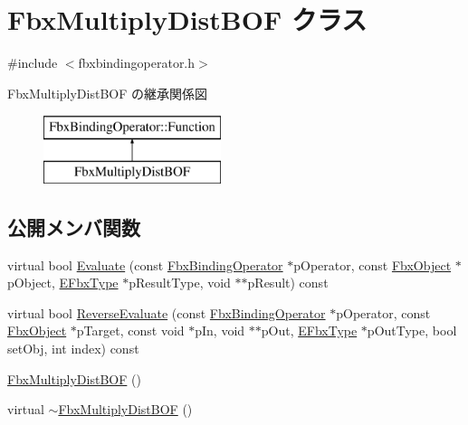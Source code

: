 \hypertarget{class_fbx_multiply_dist_b_o_f}{}\section{Fbx\+Multiply\+Dist\+B\+OF クラス}
\label{class_fbx_multiply_dist_b_o_f}


{\ttfamily \#include $<$fbxbindingoperator.\+h$>$}

Fbx\+Multiply\+Dist\+B\+OF の継承関係図\begin{figure}[H]
\begin{center}
\leavevmode
\includegraphics[height=2.000000cm]{class_fbx_multiply_dist_b_o_f}
\end{center}
\end{figure}
\subsection*{公開メンバ関数}
\begin{DoxyCompactItemize}
\item 
virtual bool \hyperlink{class_fbx_multiply_dist_b_o_f_a3c6639f5d765181313578955f38996a4}{Evaluate} (const \hyperlink{class_fbx_binding_operator}{Fbx\+Binding\+Operator} $\ast$p\+Operator, const \hyperlink{class_fbx_object}{Fbx\+Object} $\ast$p\+Object, \hyperlink{fbxpropertytypes_8h_a73913a5ddfb20e57c6f25e9e6784bd92}{E\+Fbx\+Type} $\ast$p\+Result\+Type, void $\ast$$\ast$p\+Result) const
\item 
virtual bool \hyperlink{class_fbx_multiply_dist_b_o_f_af5eef2d2b8168d2be835a1643fa35ca1}{Reverse\+Evaluate} (const \hyperlink{class_fbx_binding_operator}{Fbx\+Binding\+Operator} $\ast$p\+Operator, const \hyperlink{class_fbx_object}{Fbx\+Object} $\ast$p\+Target, const void $\ast$p\+In, void $\ast$$\ast$p\+Out, \hyperlink{fbxpropertytypes_8h_a73913a5ddfb20e57c6f25e9e6784bd92}{E\+Fbx\+Type} $\ast$p\+Out\+Type, bool set\+Obj, int index) const
\item 
\hyperlink{class_fbx_multiply_dist_b_o_f_a2daa21f8e0f9f823cfee66d39a8238ac}{Fbx\+Multiply\+Dist\+B\+OF} ()
\item 
virtual \hyperlink{class_fbx_multiply_dist_b_o_f_a76c0a1ebc3ce7fd958414895cb7602af}{$\sim$\+Fbx\+Multiply\+Dist\+B\+OF} ()
\end{DoxyCompactItemize}
